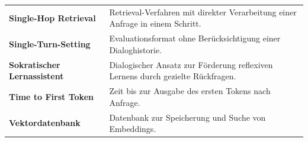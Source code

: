 \begin{tabularx}{\textwidth}{>{\bfseries}p{4cm} X}
Single-Hop Retrieval & Retrieval-Verfahren mit direkter Verarbeitung einer Anfrage in einem Schritt. \\

Single-Turn-Setting & Evaluationsformat ohne Berücksichtigung einer Dialoghistorie. \\

Sokratischer Lernassistent & Dialogischer Ansatz zur Förderung reflexiven Lernens durch gezielte Rückfragen. \\

Time to First Token & Zeit bis zur Ausgabe des ersten Tokens nach Anfrage. \\

Vektordatenbank & Datenbank zur Speicherung und Suche von Embeddings. \\

\end{tabularx}